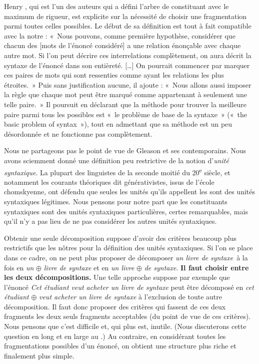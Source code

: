 Henry \citet{gleason1955introduction}, qui est l’un des auteurs qui a défini l’arbre de constituant avec le maximum de rigueur, est explicite sur la nécessité de choisir une fragmentation parmi toutes celles possibles. Le début de sa définition est tout à fait compatible avec la notre : «~Nous pouvons, comme première hypothèse, considérer que chacun des [mots de l’énoncé considéré] a une relation énonçable avec chaque autre mot. Si l’on peut décrire ces interrelations complètement, on aura décrit la syntaxe de l’énoncé dans son entièreté. […] On pourrait commencer par marquer ces paires de mots qui sont ressenties comme ayant les relations les plus étroites.~» Puis sans justification aucune, il ajoute : «~Nous allons aussi imposer la règle que chaque mot peut être marqué comme appartenant à seulement une telle paire.~» Il poursuit en déclarant que la méthode pour trouver la meilleure paire parmi tous les possibles est «~le problème de base de la syntaxe~» («~the basic problem of syntax~»), tout en admettant que sa méthode est un peu désordonnée et ne fonctionne pas complètement.

Nous ne partageons pas le point de vue de Gleason et ses contemporains. Nous avons sciemment donné une définition peu restrictive de la notion d’\textit{unité syntaxique}. La plupart des linguistes de la seconde moitié du 20\textsuperscript{e} siècle, et notamment les courants théoriques dit générativistes, issus de l’école chomskyenne, ont défendu que seules les unités qu’ils appellent les  sont des unités syntaxiques légitimes. Nous pensons pour notre part que les constituants syntaxiques sont des unités syntaxiques particulières, certes remarquables, mais qu’il n’y a pas lieu de ne pas considérer les autres unités syntaxiques.

Obtenir une seule décomposition suppose d’avoir des critères beaucoup plus restrictifs que les nôtres pour la définition des unités syntaxiques. Si l’on se place dans ce cadre, on ne peut plus proposer de décomposer \textit{un livre de syntaxe}~à la fois en \textit{un} ${\oplus}$ \textit{livre de syntaxe} et en \textit{un livre} ${\oplus}$ \textit{de syntaxe}. \textbf{Il faut choisir entre les deux décompositions.} Une telle approche suppose par exemple que l’énoncé \textit{Cet étudiant veut acheter un livre de syntaxe} peut être décomposé en \textit{cet étudiant} ${\oplus}$ \textit{veut acheter un livre de syntaxe} à l’exclusion de toute autre décomposition. Il faut donc proposer des critères qui fassent de ces deux fragments les deux seuls fragments acceptables (du point de vue de ces critères). Nous pensons que c’est difficile et, qui plus est, inutile. (Nous discuterons cette question en long et en large au .) Au contraire, en considérant toutes les fragmentations possibles d’un énoncé, on obtient une structure plus riche et finalement plus simple.

